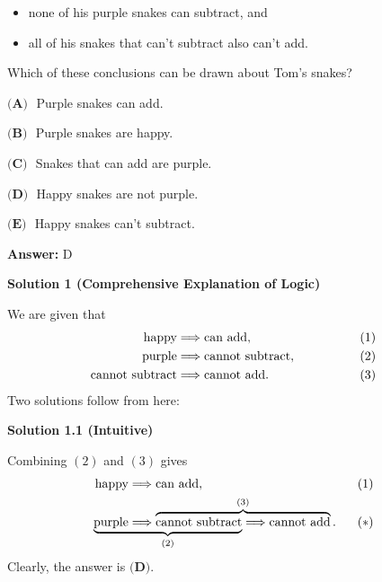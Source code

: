 \begin{enumerate}
            \begin{itemize}
        \item none of his purple snakes can subtract, and
            \end{itemize}
            
            \begin{itemize}
        \item all of his snakes that can't subtract also can't add.
            \end{itemize}
            Which of these conclusions can be drawn about Tom's snakes?


 $\textbf{(A) }$ Purple snakes can add.


 $\textbf{(B) }$ Purple snakes are happy.


 $\textbf{(C) }$ Snakes that can add are purple.


 $\textbf{(D) }$ Happy snakes are not purple.


 $\textbf{(E) }$ Happy snakes can't subtract.


 
 \textbf{Answer: }D



\textbf{Solution 1 (Comprehensive Explanation of Logic)}

We are given that
 \begin{align*} \text{happy}&\Longrightarrow\text{can add}, &(1) \\ \text{purple}&\Longrightarrow\text{cannot subtract}, \hspace{15mm} &(2) \\ \text{cannot subtract}&\Longrightarrow\text{cannot add}. &(3) \end{align*}
Two solutions follow from here:

 



\textbf{Solution 1.1 (Intuitive)}

Combining $(2)$ and $(3)$ gives
 \begin{align*} \text{happy}&\Longrightarrow\text{can add}, &(1) \\ \lefteqn{\underbrace{\phantom{\text{purple}\Longrightarrow\text{cannot subtract}}}_{(2)}}\text{purple}&\Longrightarrow\overbrace{\text{cannot subtract}\Longrightarrow\text{cannot add}}^{(3)}. \hspace{2.5mm} &(*) \end{align*}
Clearly, the answer is $\boxed{\textbf{(D)}}.$





\end{enumerate}
